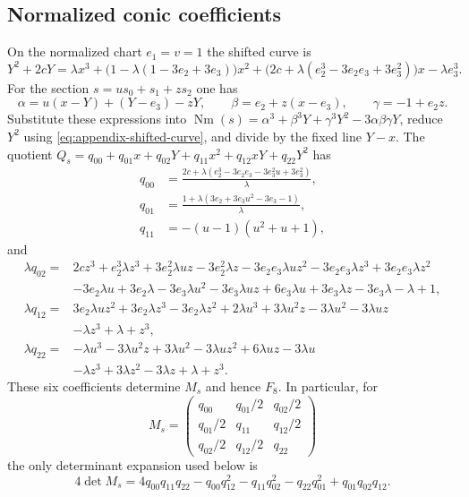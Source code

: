 \subsection{Normalized conic coefficients}
\label{app:normalized-conic}
On the normalized chart $e_1=v=1$ the shifted curve is
\begin{equation}
 Y^2+2cY
 =\lambda x^3+\bigl(1-\lambda(1-3e_2+3e_3)\bigr)x^2
 +\bigl(2c+\lambda(e_2^3-3e_2e_3+3e_3^2)\bigr)x
 -\lambda e_3^3.
\label{eq:appendix-shifted-curve}
\end{equation}
For the section $s=us_0+s_1+zs_2$ one has
\[
 \alpha=u(x-Y)+(Y-e_3)-zY,\qquad
 \beta=e_2+z(x-e_3),\qquad
 \gamma=-1+e_2z.
\]
Substitute these expressions into
$\operatorname{Nm}(s)=\alpha^3+\beta^3Y+\gamma^3Y^2-3\alpha\beta\gamma Y$,
reduce $Y^2$ using \eqref{eq:appendix-shifted-curve}, and divide by the fixed
line $Y-x$.  The quotient
$Q_s=q_{00}+q_{01}x+q_{02}Y+q_{11}x^2+q_{12}xY+q_{22}Y^2$ has
\begin{align*}
q_{00}&=\frac{2c+\lambda(e_2^3-3e_2e_3-3e_3^2u+3e_3^2)}{\lambda},\\
q_{01}&=\frac{1+\lambda(3e_2+3e_3u^2-3e_3-1)}{\lambda},\\
q_{11}&=-(u-1)(u^2+u+1),
\end{align*}
and
\begin{align*}
\lambda q_{02}={}&2cz^3+e_2^3\lambda z^3+3e_2^2\lambda uz-3e_2^2\lambda z
 -3e_2e_3\lambda uz^2-3e_2e_3\lambda z^3+3e_2e_3\lambda z^2\\
&-3e_2\lambda u+3e_2\lambda-3e_3\lambda u^2-3e_3\lambda uz
 +6e_3\lambda u+3e_3\lambda z-3e_3\lambda-\lambda+1,\\
\lambda q_{12}={}&3e_2\lambda uz^2+3e_2\lambda z^3-3e_2\lambda z^2
 +2\lambda u^3+3\lambda u^2z-3\lambda u^2-3\lambda uz\\
&-\lambda z^3+\lambda+z^3,\\
\lambda q_{22}={}&-\lambda u^3-3\lambda u^2z+3\lambda u^2-3\lambda uz^2
 +6\lambda uz-3\lambda u\\
&-\lambda z^3+3\lambda z^2-3\lambda z+\lambda+z^3.
\end{align*}
These six coefficients determine $M_s$ and hence $F_8$.  In particular, for
\[
 M_s=\begin{pmatrix}
 q_{00}&q_{01}/2&q_{02}/2\\
 q_{01}/2&q_{11}&q_{12}/2\\
 q_{02}/2&q_{12}/2&q_{22}
 \end{pmatrix}
\]
the only determinant expansion used below is
\begin{equation}
 4\det M_s=
 4q_{00}q_{11}q_{22}-q_{00}q_{12}^2-q_{11}q_{02}^2
 -q_{22}q_{01}^2+q_{01}q_{02}q_{12}.
\label{eq:appendix-determinant-expansion}
\end{equation}
